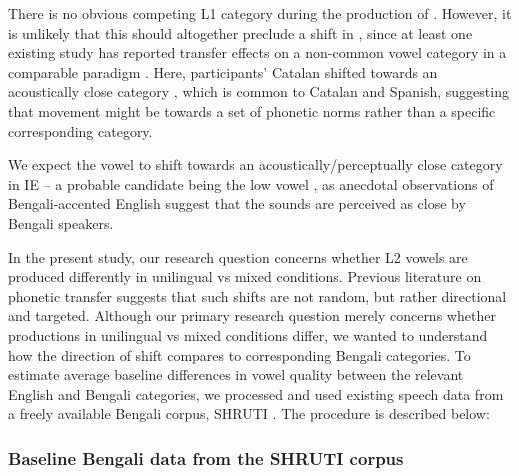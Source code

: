 \documentclass[12 pt]{article}
\newcommand{\nt}[1]{\textipa{[#1]}} %
\begin{document}

There is no obvious competing L1 category during the production of \nt{2}. However, it is unlikely that this should altogether preclude a shift in \nt{2}, since at least one existing study has reported transfer effects on a non-common vowel category in a comparable paradigm \citep{simonet2014phonetic}. Here, participants' Catalan \nt{O} shifted towards an acoustically close category \nt{o}, which is common to Catalan and Spanish, suggesting that movement might be towards a set of phonetic norms rather than a specific corresponding category. 

We expect the vowel \nt{2} to shift towards an acoustically/perceptually close category in IE -- a probable candidate being the low vowel \nt{a:}, as anecdotal observations of Bengali-accented English suggest that the sounds are perceived as close by Bengali speakers. 


In the present study, our research question concerns whether L2 vowels are produced differently in unilingual vs mixed conditions. Previous literature on phonetic transfer suggests that such shifts are not random, but rather directional and targeted. Although our primary research question merely concerns whether productions in unilingual vs mixed conditions differ, we wanted to understand how the direction of shift compares to corresponding Bengali categories. To estimate average baseline differences in vowel quality between the relevant English and Bengali categories, we processed and used existing speech data from a freely available Bengali corpus, SHRUTI \citep{shruticorpus}. The procedure is described below:

\subsubsection*{Baseline Bengali data from the SHRUTI corpus}
\end{document}
